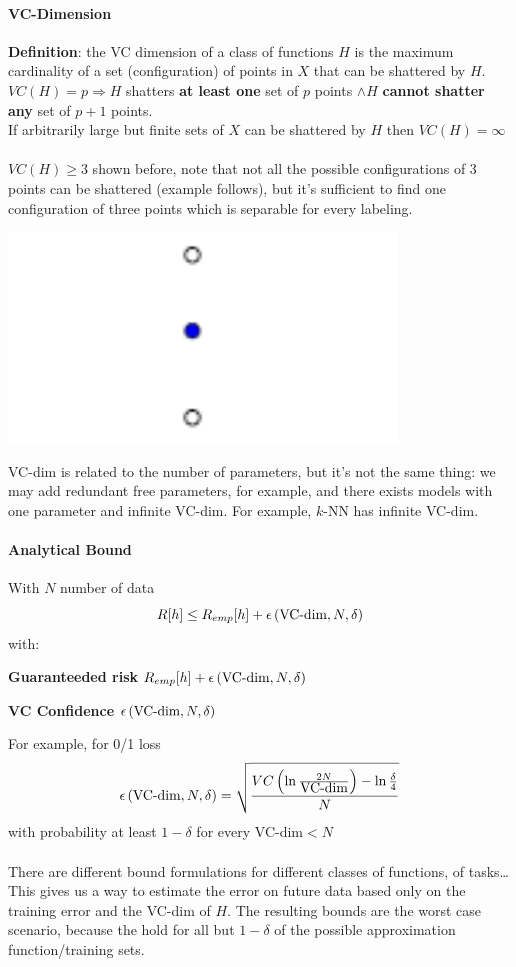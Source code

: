 \documentclass[10pt]{report}
\begin{document}
\paragraph{VC-Dimension} \textbf{Definition}: the VC dimension of a class of functions $H$ is the maximum cardinality of a set (configuration) of points in $X$ that can be shattered by $H$.\\
$VC(H) = p \Rightarrow H$ shatters \textbf{at least one} set of $p$ points $\wedge H$ \textbf{cannot shatter any} set of $p+1$ points.\\
If arbitrarily large but finite sets of $X$ can be shattered by $H$ then $VC(H) = \infty$\\\\
$VC(H)\geq 3$ shown before, note that not all the possible configurations of $3$ points can be shattered (example follows), but it's sufficient to find one configuration of three points which is separable for every labeling.
\begin{center}
	\includegraphics[scale=0.5]{15.png}
\end{center}
VC-dim is related to the number of parameters, but it's not the same thing: we may add redundant free parameters, for example, and there exists models with one parameter and infinite VC-dim. For example, $k$-NN has infinite VC-dim.
\paragraph{Analytical Bound} With $N$ number of data $$R[h]\leq R_{emp}[h] + \epsilon\left(\hbox{VC-dim}, N, \delta\right)$$
with:
\begin{list}{}{}
	\item \textbf{Guaranteeded risk} $R_{emp}[h] + \epsilon\left(\hbox{VC-dim}, N, \delta\right)$
	\item \textbf{VC Confidence} $\epsilon\left(\hbox{VC-dim}, N, \delta\right)$
\end{list}
For example, for 0/1 loss $$\epsilon\left(\hbox{VC-dim}, N, \delta\right) = \sqrt{\frac{VC\left(\ln\frac{2N}{\hbox{VC-dim}}\right) - \ln\frac{\delta}{4}}{N}}$$ with probability at least $1-\delta$ for every VC-dim$< N$\\\\
There are different bound formulations for different classes of functions, of tasks\ldots\\
This gives us a way to estimate the error on future data based only on the training error and the VC-dim of $H$. The resulting bounds are the worst case scenario, because the hold for all but $1-\delta$ of the possible approximation function/training sets.
\end{document}
